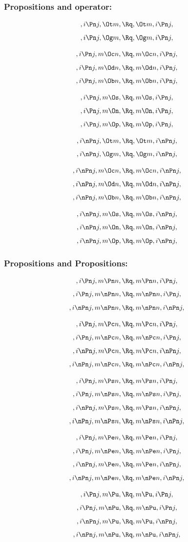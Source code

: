 \bigskip
\bigskip
\bigskip
\bigskip
\subsubsection{ Propositions and operator:}
\[, i \Pn j, \Ot m, \Rq , \Ot m, i \Pn j,\]
\[, i \Pn j, \Og m, \Rq , \Og m, i \Pn j,\]

\[, i \Pn j, m \Oc n, \Rq , m \Oc n, i \Pn j,\]
\[, i \Pn j, m \Od n, \Rq , m \Od n, i \Pn j,\]
\[, i \Pn j, m \Ob n, \Rq , m \Ob n, i \Pn j,\]

\[, i \Pn j, m \Os, \Rq , m \Os, i \Pn j,\]
\[, i \Pn j, m \On, \Rq , m \On, i \Pn j,\]
\[, i \Pn j, m \Op, \Rq , m \Op, i \Pn j,\]

\bigskip
\bigskip
\[, i \nPn j, \Ot m, \Rq , \Ot m, i \nPn j,\]
\[, i \nPn j, \Og m, \Rq , \Og m, i \nPn j,\]

\[, i \nPn j, m \Oc n, \Rq , m \Oc n, i \nPn j,\]
\[, i \nPn j, m \Od n, \Rq , m \Od n, i \nPn j,\]
\[, i \nPn j, m \Ob n, \Rq , m \Ob n, i \nPn j,\]

\[, i \nPn j, m \Os, \Rq , m \Os, i \nPn j,\]
\[, i \nPn j, m \On, \Rq , m \On, i \nPn j,\]
\[, i \nPn j, m \Op, \Rq , m \Op, i \nPn j,\]


\bigskip
\bigskip
\bigskip
\bigskip
\subsubsection{ Propositions and Propositions:}
\[,i \Pn j, m \Pn n, \Rq , m \Pn n, i \Pn j,\]
\[,i \Pn j, m \nPn n, \Rq , m \nPn n, i \Pn j,\]
\[,i \nPn j, m \nPn n, \Rq , m \nPn n, i \nPn j,\]

\[,i \Pn j, m \Pc n, \Rq , m \Pc n, i \Pn j,\]
\[,i \Pn j, m \nPc n, \Rq , m \nPc n, i \Pn j,\]
\[,i \nPn j, m \Pc n, \Rq , m \Pc n, i \nPn j,\]
\[,i \nPn j, m \nPc n, \Rq , m \nPc n, i \nPn j,\]

\[,i \Pn j, m \Ps n, \Rq , m \Ps n, i \Pn j,\]
\[,i \Pn j, m \nPs n, \Rq , m \nPs n, i \Pn j,\]
\[,i \nPn j, m \Ps n, \Rq , m \Ps n, i \nPn j,\]
\[,i \nPn j, m \nPs n, \Rq , m \nPs n, i \nPn j,\]


\[,i \Pn j, m \Pe n, \Rq , m \Pe n, i \Pn j,\]
\[,i \Pn j, m \nPe n, \Rq , m \nPe n, i \Pn j,\]
\[,i \nPn j, m \Pe n, \Rq , m \Pe n, i \nPn j,\]
\[,i \nPn j, m \nPe n, \Rq , m \nPe n, i \nPn j,\]

\[,i \Pn j, m \Pu, \Rq , m \Pu, i \Pn j,\]
\[,i \Pn j, m \nPu, \Rq , m \nPu, i \Pn j,\]
\[,i \nPn j, m \Pu, \Rq , m \Pu, i \nPn j,\]
\[,i \nPn j, m \nPu, \Rq , m \nPu, i \nPn j,\]




